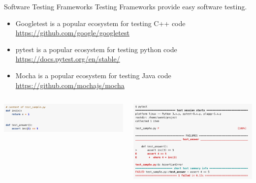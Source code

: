 \documentclass{setbeamer}
\begin{document}
\begin{frame}{Software Testing Frameworks}
\vspace{.3cm}
Testing Frameworks provide easy software testing.
\begin{itemize}
\item Googletest is a popular ecosystem for testing C++ code \url{https://github.com/google/googletest}
\item pytest is a popular ecosystem for testing python code \url{https://docs.pytest.org/en/stable/}
\item Mocha is a popular ecosystem for testing Java code \url{https://github.com/mochajs/mocha}
\end{itemize}
\begin{columns}
\begin{column}{0.5\textwidth}
\includegraphics[width=7cm]{resources/pytest1.png}
\end{column}
\begin{column}{0.5\textwidth}
\vspace{1cm}
\includegraphics[width=7cm]{resources/pytest2.png} 
\end{column}
\end{columns}
  
      
\end{frame}
\end{document}
